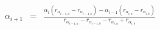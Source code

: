


\begin{eqnarray*}
  \alpha_{i+1} & = & \frac{
			                  \alpha_{i} \left( r_{\alpha_{i-1,a}} - r_{\alpha_{i-1,b}} \right)
                   - \alpha_{i-1} \left( r_{\alpha_{i,a}} - r_{\alpha_{i,b}} \right)}
                     {r_{\alpha_{i-1,a}} - r_{\alpha_{i-1,b}} -
                      r_{\alpha_{i,a}} + r_{\alpha_{i,b}}}
\end{eqnarray*}

